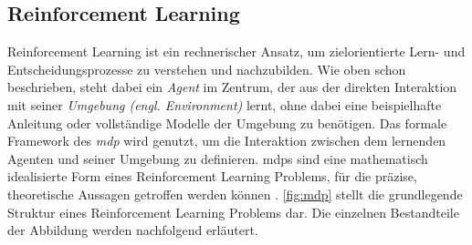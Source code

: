     
    
    
    


\subsection{Reinforcement Learning}
Reinforcement Learning ist ein rechnerischer Ansatz, um zielorientierte Lern- und Entscheidungsprozesse zu verstehen und nachzubilden.
Wie oben schon beschrieben, steht dabei ein \emph{Agent} im Zentrum, der aus der direkten Interaktion mit seiner \emph{Umgebung (engl. Environment)} lernt, ohne dabei eine beispielhafte Anleitung oder vollständige Modelle der Umgebung zu benötigen.
Das formale Framework des \emph{\acf{mdp}} wird genutzt, um die Interaktion zwischen dem lernenden Agenten und seiner Umgebung zu definieren.
\acp{mdp} sind eine mathematisch idealisierte Form eines Reinforcement Learning Problems, für die präzise, theoretische Aussagen getroffen werden können \cite[13]{sutton2018rlintro}.
\autoref{fig:mdp} stellt die grundlegende Struktur eines Reinforcement Learning Problems dar.
Die einzelnen Bestandteile der Abbildung werden nachfolgend erläutert.

